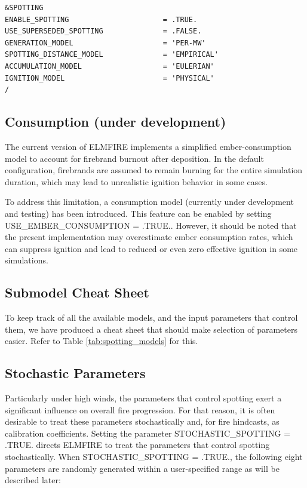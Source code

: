 \begin{verbatim}
&SPOTTING
ENABLE_SPOTTING 					 = .TRUE.
USE_SUPERSEDED_SPOTTING 			 = .FALSE.
GENERATION_MODEL                     = 'PER-MW'
SPOTTING_DISTANCE_MODEL              = 'EMPIRICAL'
ACCUMULATION_MODEL                   = 'EULERIAN'
IGNITION_MODEL                       = 'PHYSICAL'
/
\end{verbatim}

\subsection{Consumption (under development)}
\label{ember_consumption}
The current version of ELMFIRE implements a simplified ember-consumption model to account for firebrand burnout after deposition. In the default configuration, firebrands are assumed to remain burning for the entire simulation duration, which may lead to unrealistic ignition behavior in some cases.

To address this limitation, a consumption model (currently under development and testing) has been introduced. This feature can be enabled by setting USE\_EMBER\_CONSUMPTION = .TRUE.. However, it should be noted that the present implementation may overestimate ember consumption rates, which can suppress ignition and lead to reduced or even zero effective ignition in some simulations.

\subsection{Submodel Cheat Sheet}

To keep track of all the available models, and the input parameters that control them, we have produced a cheat sheet that should make selection of parameters easier. Refer to Table \ref{tab:spotting_models} for this.



\subsection{Stochastic Parameters}
\label{stochastic_spotting}

Particularly under high winds, the parameters that control spotting exert a significant influence on overall fire progression. For that reason, it is often desirable to treat these parameters stochastically and, for fire hindcasts, as calibration coefficients. Setting the parameter STOCHASTIC\_SPOTTING = .TRUE. directs ELMFIRE to treat the parameters that control spotting stochastically. When STOCHASTIC\_SPOTTING = .TRUE., the following eight parameters are randomly generated within a user-specified range as will be described later:


